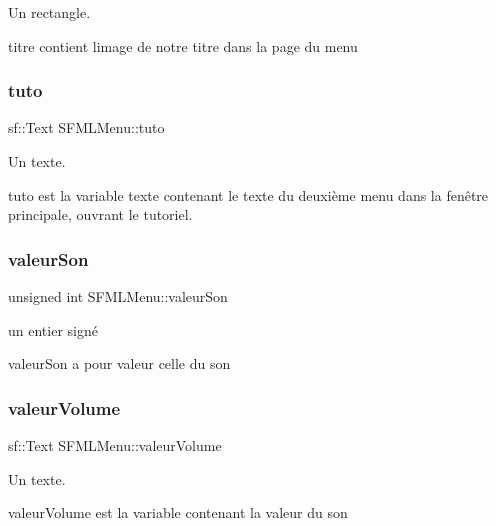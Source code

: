 Un rectangle. 

titre contient l\textquotesingle{}image de notre titre dans la page du menu \mbox{\label{class_s_f_m_l_menu_a0e520837a05bb61f39d27507f85353d7}} 
\subsubsection{\texorpdfstring{tuto}{tuto}}
{\footnotesize\ttfamily sf\+::\+Text S\+F\+M\+L\+Menu\+::tuto\hspace{0.3cm}{\ttfamily [private]}}



Un texte. 

tuto est la variable texte contenant le texte du deuxième menu dans la fenêtre principale, ouvrant le tutoriel. \mbox{\label{class_s_f_m_l_menu_a03b29038855c220ead32206cf99d258b}} 
\subsubsection{\texorpdfstring{valeur\+Son}{valeurSon}}
{\footnotesize\ttfamily unsigned int S\+F\+M\+L\+Menu\+::valeur\+Son\hspace{0.3cm}{\ttfamily [private]}}



un entier signé 

valeur\+Son a pour valeur celle du son \mbox{\label{class_s_f_m_l_menu_a3c651e4b2621b63100ac8fa314c914c6}} 
\subsubsection{\texorpdfstring{valeur\+Volume}{valeurVolume}}
{\footnotesize\ttfamily sf\+::\+Text S\+F\+M\+L\+Menu\+::valeur\+Volume\hspace{0.3cm}{\ttfamily [private]}}



Un texte. 

valeur\+Volume est la variable contenant la valeur du son \mbox{\label{class_s_f_m_l_menu_a72c2f09a8540f38ce460a16e9c6541ce}} 
